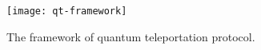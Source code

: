 \documentclass{easyclass}
\begin{document}
\begin{figure}[h]
	\centering
	\texttt{[image: qt-framework]}
	\caption{The framework of quantum teleportation protocol.}
	\label{fig:qt-framework}
\end{figure}




\ifx\flag\undefined
	
\end{document}
